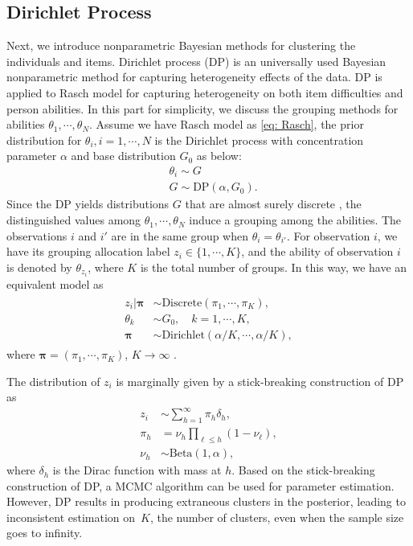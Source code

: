 \documentclass[12pt]{article}
\begin{document}
\subsection{Dirichlet Process}\label{sec:DP}
Next, we introduce nonparametric Bayesian methods for clustering the individuals and items.
Dirichlet process (DP) is an universally used Bayesian nonparametric method for capturing heterogeneity effects of the data. DP is applied
to Rasch model for capturing heterogeneity on both item difficulties and person abilities. In this part for simplicity, we discuss the grouping methods for abilities $\theta_1,\cdots,\theta_N$. Assume we have Rasch model as \eqref{eq: Rasch}, the prior distribution for $\theta_i,i=1,\cdots,N$ is the Dirichlet process with concentration parameter $\alpha$ and base distribution $G_0$ as below:
\begin{equation}
	\begin{split}
		&\theta_i\sim G\\
		&G\sim \text{DP}(\alpha,G_0).
	\end{split}
	\label{eq:dp}
\end{equation}
Since the DP yields distributions $G$ that are almost surely discrete \citep{ferguson1973bayesian}, the distinguished values among $\theta_1,\cdots,\theta_N$ induce a grouping among the abilities. The observations $i$ and $i'$ are in the same group when $\theta_i=\theta_{i'}$. For observation $i$, we have its grouping allocation label $z_i \in\{1,\cdots,K\}$, and the ability of observation $i$ is denoted by $\theta_{z_i}$, where $K$ is the total number of groups. In this way, we have an equivalent model as 
\begin{align}
	\begin{split}
		z_i|\bm{\pi}&\sim \text{Discrete} (\pi_1,\cdots,\pi_K),\\
		\theta_k &\sim G_0,\quad k=1,\cdots,K,\\
		\bm{\pi} &\sim \text{Dirichlet} (\alpha/K,\cdots,\alpha/K),
	\end{split}
	\label{eq:dpmm}
\end{align}
where $\bm{\pi}=(\pi_1, \cdots, \pi_K)$, $K\rightarrow \infty$ \citep{ishwaran2001gibbs}. 

The distribution of $z_i$ is marginally given by a stick-breaking construction \citep{sethuraman1994constructive} of DP as 
\begin{equation}
	\begin{split}
		z_i&\sim \sum_{h=1}^\infty \pi_h \delta_h,\\
		\pi_h&=\nu_h\prod_{\ell\leq h}(1-\nu_\ell),\\
		\nu_h&\sim \text{Beta}(1,\alpha),
	\end{split}
	\label{eq:s-b_construct}
\end{equation}
where $\delta_h$ is the Dirac function with mass at $h$. Based on the stick-breaking construction of DP, a MCMC algorithm \citep{ishwaran2001gibbs} can be used for parameter estimation. However, DP results in producing extraneous clusters in the posterior, leading to
inconsistent estimation on~$K$, the number of clusters, even when the
sample
size goes to infinity.
\end{document}
